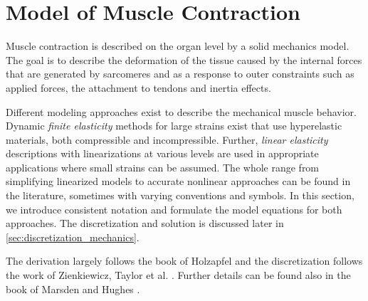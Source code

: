 \section{Model of Muscle Contraction}\label{sec:model_muscle_contraction}




Muscle contraction is described on the organ level by a solid mechanics model. The goal is to describe the deformation of the tissue caused by the internal forces that are generated by sarcomeres and as a response to outer constraints such as applied forces, the attachment to tendons and inertia effects.

Different modeling approaches exist to describe the mechanical muscle behavior. Dynamic \emph{finite elasticity} methods for large strains exist that use hyperelastic materials, both compressible and incompressible. Further, \emph{linear elasticity} descriptions with linearizations at various levels are used in appropriate applications where small strains can be assumed. The whole range from simplifying linearized models to accurate nonlinear approaches can be found in the literature, sometimes with varying conventions and symbols.
In this section, we introduce consistent notation and formulate the model equations for both approaches. The discretization and solution is discussed later in \cref{sec:discretization_mechanics}.

The derivation largely follows the book of Holzapfel \cite{holzapfel2000nonlinear} and the discretization follows the work of Zienkiewicz, Taylor et al. \cite{zienkiewicz1977finite,zienkiewicz2005finite}. Further details can be found also in the book of Marsden and Hughes \cite{marsden1994mathematical}.


